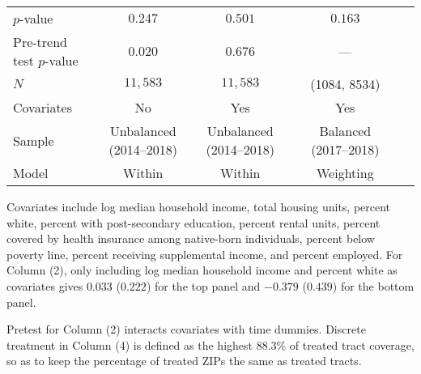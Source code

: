 \begin{table}[tbh]
\begin{threeparttable}
\begin{tabular}{lcccccc}
\quad $p$-value                  &                                  $0.247$ &                                  $0.501$ &                                          &                                  $0.163$ &                                          &                                          \\
\quad Pre-trend test $p$-value   &                                  $0.020$ &                                  $0.676$ &                                          &                                      --- &                                          &                                          \\
\quad $N$                        &                                 $11,583$ &                                 $11,583$ &                                          &                             (1084, 8534) &                                          &                                          \\
\quad Covariates                 &                                       No &                                      Yes &                                          &                                      Yes &                                          &                                          \\
\quad Sample                     &                  Unbalanced (2014--2018) &                  Unbalanced (2014--2018) &                                          &                    Balanced (2017--2018) &                                          &                                          \\
\quad Model                      &                                   Within &                                   Within &                                          &                                Weighting &                                          &                                          \\
\bottomrule
\end{tabular}

        \begin{tablenotes}
        \footnotesize
        \item     Covariates include log median household income, total housing units, percent white,
    percent with post-secondary education,
    percent rental units, percent covered by health insurance among native-born individuals,
    percent below poverty line, percent receiving supplemental income, and percent employed.
    For Column (2), only including log median household income and
percent white as covariates gives $0.033$ ($0.222$) for the top panel and
$-0.379$ ($0.439$) for the bottom panel.

    Pretest for Column (2) interacts covariates with time dummies.
    Discrete treatment in Column (4) is defined as
    the highest 88.3\% of treated
    tract coverage, so as to keep the percentage of treated ZIPs the same as treated tracts.
    
        \end{tablenotes}
        \end{threeparttable}

        \end{table}
        